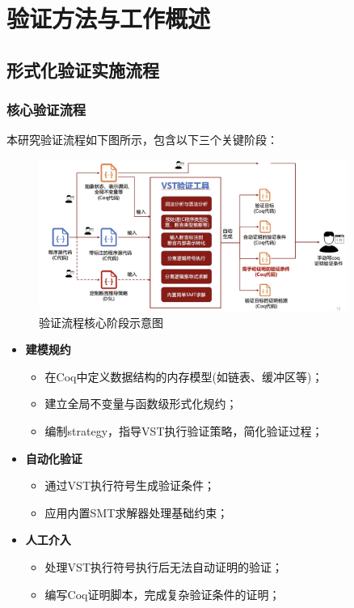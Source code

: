 \chapter{验证方法与工作概述}
\section{形式化验证实施流程}
\label{sec:verification-process}

\subsection{核心验证流程}
\label{subsec:core-flow}

本研究验证流程如下图所示，包含以下三个关键阶段：
\begin{figure}[h]
    \centering
    \includegraphics[width=0.9\textwidth]{./fig/vst-flow.png}
    \caption{验证流程核心阶段示意图}
    \label{fig:vst-flow}
\end{figure}

\begin{itemize}
    \item \textbf{建模规约}
    \begin{itemize}
        \item 在Coq中定义数据结构的内存模型(如链表、缓冲区等)；
        \item 建立全局不变量与函数级形式化规约；
        \item 编制strategy，指导VST执行验证策略，简化验证过程；
    \end{itemize}

    \item \textbf{自动化验证}
    \begin{itemize}
        \item 通过VST执行符号生成验证条件；
        \item 应用内置SMT求解器处理基础约束；
    \end{itemize}

    \item \textbf{人工介入}
    \begin{itemize}
        \item 处理VST执行符号执行后无法自动证明的验证；
        \item 编写Coq证明脚本，完成复杂验证条件的证明；
    \end{itemize}
\end{itemize}

